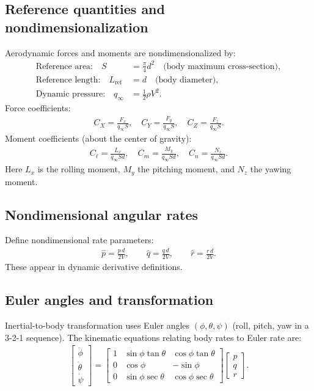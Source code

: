 \documentclass[11pt]{article}
\begin{document}
\subsection{Reference quantities and nondimensionalization}
Aerodynamic forces and moments are nondimensionalized by:
\begin{align}
\text{Reference area:}\quad S &= \frac{\pi}{4}d^2 \quad \text{(body maximum cross-section)},\\
\text{Reference length:}\quad L_{\text{ref}} &= d \quad \text{(body diameter)},\\
\text{Dynamic pressure:}\quad q_\infty &= \frac{1}{2}\rho V^2.
\end{align}
Force coefficients:
\begin{align}
C_X = \frac{F_x}{q_\infty S},\quad
C_Y = \frac{F_y}{q_\infty S},\quad
C_Z = \frac{F_z}{q_\infty S}.
\end{align}
Moment coefficients (about the center of gravity):
\begin{align}
C_\ell = \frac{L_x}{q_\infty S d},\quad
C_m = \frac{M_y}{q_\infty S d},\quad
C_n = \frac{N_z}{q_\infty S d}.
\end{align}
Here $L_x$ is the rolling moment, $M_y$ the pitching moment, and $N_z$ the yawing moment.

\subsection{Nondimensional angular rates}
Define nondimensional rate parameters:
\begin{align}
\hat p = \frac{p\,d}{2V},\qquad
\hat q = \frac{q\,d}{2V},\qquad
\hat r = \frac{r\,d}{2V}.
\end{align}
These appear in dynamic derivative definitions.

\subsection{Euler angles and transformation}
Inertial-to-body transformation uses Euler angles $(\phi,\theta,\psi)$ (roll, pitch, yaw in a 3-2-1 sequence). The kinematic equations relating body rates to Euler rate are:
\begin{align}
\begin{bmatrix}\dot\phi\\\dot\theta\\\dot\psi\end{bmatrix}
=
\begin{bmatrix}
1 & \sin\phi\tan\theta & \cos\phi\tan\theta\\
0 & \cos\phi & -\sin\phi\\
0 & \sin\phi\sec\theta & \cos\phi\sec\theta
\end{bmatrix}
\begin{bmatrix}p\\q\\r\end{bmatrix}.
\end{align}
\end{document}

